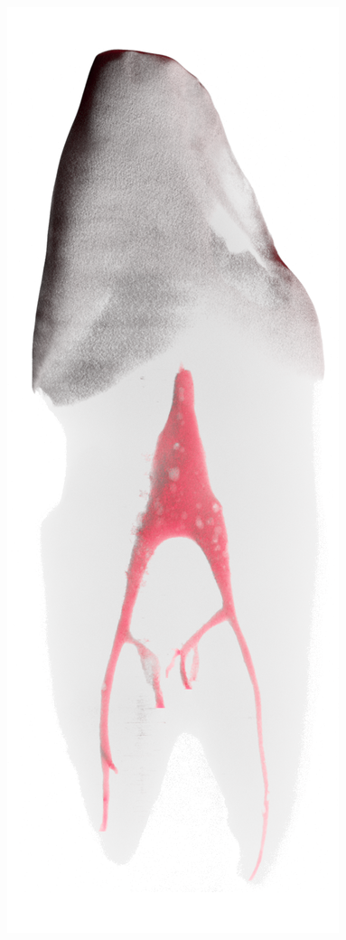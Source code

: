 \begin{frame}
\begin{frame}
		\includegraphics[height=\imheight]{./images/zmk/rcs/Tooth0642}%

\end{frame}
\end{frame}
